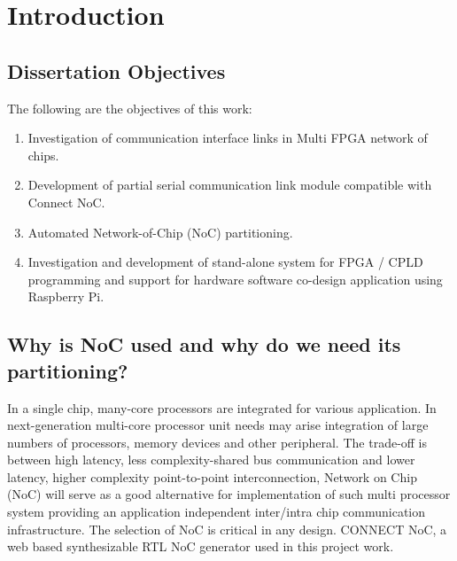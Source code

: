 \thispagestyle{empty}
\setcounter{page}{1}
\chapter{Introduction}
\label{chapter1}


\section {Dissertation Objectives}
The following are the objectives of this work:

\begin{enumerate} 
	\item{Investigation of communication interface links in Multi FPGA network of chips.}
	\item{Development of partial serial communication link module compatible with Connect NoC.}
	\item{Automated Network-of-Chip (NoC) partitioning.}
	\item{Investigation and development of stand-alone system for FPGA / CPLD programming and support for hardware software co-design application using Raspberry Pi.}
\end{enumerate}


\section{Why is NoC used and why do we need its partitioning?} 
\hspace{5mm}In a single chip, many-core processors are integrated for various application. In next-generation multi-core processor unit needs may arise integration of large numbers of processors, memory devices and other peripheral. The trade-off is between high latency, less complexity-shared bus communication and lower latency, higher complexity point-to-point interconnection, Network on Chip (NoC) will serve as a good alternative for implementation of such multi processor system providing an application independent inter/intra chip communication infrastructure. The selection of NoC is critical in any design\cite{DesignReuse}. CONNECT NoC, a web based synthesizable RTL NoC generator used in this project work.
 
